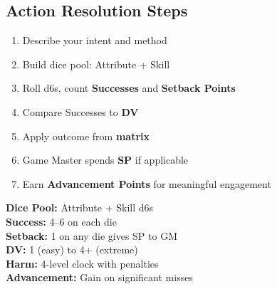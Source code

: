 \begin{multicols}{2}
\section{Action Resolution Steps}

\begin{enumerate}
  \item Describe your intent and method
  \item Build dice pool: Attribute + Skill
  \item Roll d6s, count \textbf{Successes} and \textbf{Setback Points}
  \item Compare Successes to \textbf{DV}
  \item Apply outcome from \textbf{matrix}
  \item Game Master spends \textbf{SP} if applicable
  \item Earn \textbf{Advancement Points} for meaningful engagement
\end{enumerate}

\begin{tcolorbox}[colback=blue!5!white,colframe=blue!75!black,title=Quick Reference,fonttitle=\bfseries]
\textbf{Dice Pool:} Attribute + Skill d6s \\
\textbf{Success:} 4--6 on each die \\
\textbf{Setback:} 1 on any die gives SP to GM \\
\textbf{DV:} 1 (easy) to 4+ (extreme) \\
\textbf{Harm:} 4-level clock with penalties \\
\textbf{Advancement:} Gain on significant misses 
\end{tcolorbox}

\end{multicols}
